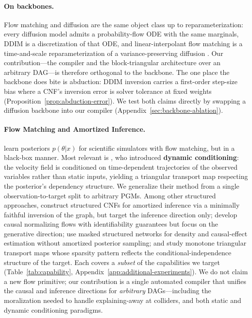 \paragraph{On backbones.}
\label{par:backbone}
Flow matching and diffusion are the same object class up to reparameterization: every diffusion model admits a probability-flow ODE with the same marginals, DDIM is a discretization of that ODE, and linear-interpolant flow matching is a time-and-scale reparameterization of a variance-preserving diffusion \citep{song2021scorebased, song2021ddim, gao2024diffusionmeetsflow}. Our contribution---the compiler and the block-triangular architecture over an arbitrary DAG---is therefore orthogonal to the backbone. The one place the backbone does bite is abduction: DDIM inversion carries a first-order step-size bias where a CNF's inversion error is solver tolerance at fixed weights (Proposition~\ref{prop:abduction-error}). We test both claims directly by swapping a diffusion backbone into our compiler (Appendix~\ref{sec:backbone-ablation}).

\paragraph{Flow Matching and Amortized Inference.}
\citet{wildberger_flow_2023} learn posteriors $p(\theta|x)$ for scientific simulators with flow matching, but in a black-box manner. Most relevant is \citet{jeong_conditional_2025}, who introduced \textbf{dynamic conditioning}: the velocity field is conditioned on time-dependent trajectories of the observed variables rather than static inputs, yielding a triangular transport map respecting the posterior's dependency structure. We generalize their method from a single observation-to-target split to arbitrary PGMs.
Among other structured approaches, \citet{weilbach2020structured} construct structured CNFs for amortized inference via a minimally faithful inversion of the graph, but target the inference direction only; \citet{javaloy2023causal} develop causal normalizing flows with identifiability guarantees but focus on the generative direction; \citet{chen2023structured} use masked structured networks for density and causal-effect estimation without amortized posterior sampling; and \citet{baptista2024representation} study monotone triangular transport maps whose sparsity pattern reflects the conditional-independence structure of the target. Each covers a \emph{subset} of the capabilities we target (Table~\ref{tab:capability}, Appendix~\ref{app:additional-experiments}). We do not claim a new flow primitive; our contribution is a single automated compiler that unifies the causal and inference directions for \emph{arbitrary} DAGs---including the moralization needed to handle explaining-away at colliders, and both static and dynamic conditioning paradigms.
